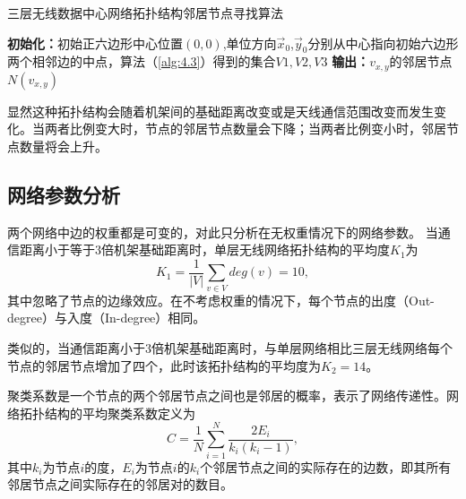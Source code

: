 \begin{algorithm}
	\SetAlgoLined
	\caption{三层无线数据中心网络拓扑结构邻居节点寻找算法} \label{alg:4.4}
	\textbf{初始化：}初始正六边形中心位置$(0,0)$,单位方向$\vec x_0$,$\vec y_0$分别从中心指向初始六边形两个相邻边的中点，算法（\ref{alg:4.3}）得到的集合$V1,V2,V3$\;
	{
	}
	\textbf{输出：}$v_{x,y}$的邻居节点$N(v_{x,y})$
\end{algorithm}

显然这种拓扑结构会随着机架间的基础距离改变或是天线通信范围改变而发生变化。当两者比例变大时，节点的邻居节点数量会下降；当两者比例变小时，邻居节点数量将会上升。

\subsection{网络参数分析}

两个网络中边的权重都是可变的，对此只分析在无权重情况下的网络参数。
当通信距离小于等于$3$倍机架基础距离时，单层无线网络拓扑结构的平均度$K_1$为
\begin{equation}
	K_1= \frac{1}{|V|}\sum_{v\in V}deg(v) = 10,
\end{equation}
其中忽略了节点的边缘效应。在不考虑权重的情况下，每个节点的出度（Out-degree）与入度（In-degree）相同。

类似的，当通信距离小于$3$倍机架基础距离时，与单层网络相比三层无线网络每个节点的邻居节点增加了四个，此时该拓扑结构的平均度为$K_2 = 14$。

聚类系数是一个节点的两个邻居节点之间也是邻居的概率，表示了网络传递性。网络拓扑结构的平均聚类系数定义为
\begin{equation}
  C = \frac{1}{N}\sum_{i=1}^{N}\frac{2E_i}{k_i(k_i-1)},
\end{equation}
其中$k_i$为节点$i$的度，$E_i$为节点$i$的$k_i$个邻居节点之间的实际存在的边数，即其所有邻居节点之间实际存在的邻居对的数目。

